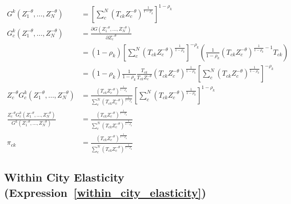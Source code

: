\documentclass[10pt]{article}
\begin{document}
\begin{align*}
    G^k (Z_1^{-\theta}, \dots, Z_N^{-\theta})                                                                    & =  [\sum_{c}^{N} (T_{ck} Z_c^{-\theta})^{\frac{1}{1 - \rho_k}}]^{1 - \rho_k}                                                                                                                     \\
    G_c^k (Z_1^{-\theta}, \dots, Z_N^{-\theta})                                                                  & = \frac{\partial G(Z_1^{-\theta}, \dots, Z_N^{-\theta})}{\partial Z_c^{-\theta}}                                                                                                                 \\
                                                                                                                 & = (1 - \rho_k)[\sum_{c}^{N} (T_{ck} Z_c^{- \theta})^{\frac{1}{1 - \rho_k}}]^{- \rho_k} (\frac{1}{1 - \rho_k} (T_{ck} Z_c^{- \theta})^{\frac{1}{1 - \rho_k} - 1} T_{ck})                          \\
                                                                                                                 & = (1 - \rho_k) \frac{1}{1 - \rho_k} \frac{T_{ck}}{T_{ck} Z_c^{- \theta}} (T_{ck} Z_c^{- \theta})^{\frac{1}{1 - \rho_k}} [\sum_{c}^{N} (T_{ck} Z_c^{- \theta})^{\frac{1}{1 - \rho_k}}]^{- \rho_k} \\
    Z_c^{- \theta} G_c^k (Z_1^{-\theta}, \dots, Z_N^{-\theta})                                                   & = \frac{(T_{ck} Z_c^{-\theta})^{\frac{1}{1 - \rho_k}}}{\sum_{c}^{N} (T_{ck} Z_c^{-\theta})^{\frac{1}{1 - \rho_k}}} [\sum_{c}^{N} (T_{ck} Z_c^{-\theta})^{\frac{1}{1 - \rho_k}}]^{1 - \rho_k}     \\
    \frac{Z_c^{- \theta} G_c^k (Z_1^{-\theta}, \dots, Z_N^{-\theta})}{G^k (Z_1^{-\theta}, \dots, Z_N^{-\theta})} & = \frac{(T_{ck} Z_c^{-\theta})^{\frac{1}{1 - \rho_k}}}{\sum_{c}^{N} (T_{ck} Z_c^{-\theta})^{\frac{1}{1 - \rho_k}}}                                                                               \\
    \pi_{ck}                                                                                                     & = \frac{(T_{ck} Z_c^{-\theta})^{\frac{1}{1 - \rho_k}}}{\sum_{c}^{N} (T_{ck} Z_c^{-\theta})^{\frac{1}{1 - \rho_k}}}
\end{align*}

\subsection{Within City Elasticity (Expression~\ref{within_city_elasticity})}
\end{document}
